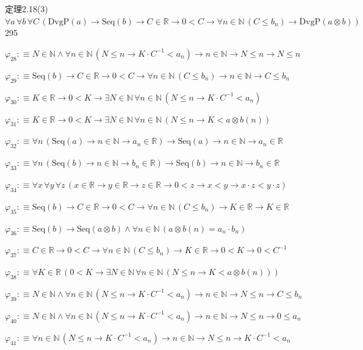\begin{fullproof}{定理2.18(3)}{$\forall a\,\forall b\,\forall C\,(\mathrm{DvgP}(a) \to \mathrm{Seq}(b) \to C \in \mathbb{R} \to 0 < C \to \forall n \in \mathbb{N}\,(C \leq b_{n}) \to \mathrm{DvgP}(a \otimes b))$}{295}
\begin{abbrevlist}
\item $\varphi_{28} :\equiv N \in \mathbb{N} \land \forall n \in \mathbb{N}\,(N \leq n \to K \cdot C^{-1} < a_{n}) \to n \in \mathbb{N} \to N \leq n \to N \leq n$
\item $\varphi_{29} :\equiv \mathrm{Seq}(b) \to C \in \mathbb{R} \to 0 < C \to \forall n \in \mathbb{N}\,(C \leq b_{n}) \to n \in \mathbb{N} \to C \leq b_{n}$
\item $\varphi_{30} :\equiv K \in \mathbb{R} \to 0 < K \to \exists N \in \mathbb{N}\,\forall n \in \mathbb{N}\,(N \leq n \to K \cdot C^{-1} < a_{n})$
\item $\varphi_{31} :\equiv K \in \mathbb{R} \to 0 < K \to \exists N \in \mathbb{N}\,\forall n \in \mathbb{N}\,(N \leq n \to K < a \otimes b(n))$
\item $\varphi_{32} :\equiv \forall n\,(\mathrm{Seq}(a) \to n \in \mathbb{N} \to a_{n} \in \mathbb{R}) \to \mathrm{Seq}(a) \to n \in \mathbb{N} \to a_{n} \in \mathbb{R}$
\item $\varphi_{33} :\equiv \forall n\,(\mathrm{Seq}(b) \to n \in \mathbb{N} \to b_{n} \in \mathbb{R}) \to \mathrm{Seq}(b) \to n \in \mathbb{N} \to b_{n} \in \mathbb{R}$
\item $\varphi_{34} :\equiv \forall x\,\forall y\,\forall z\,(x \in \mathbb{R} \to y \in \mathbb{R} \to z \in \mathbb{R} \to 0 < z \to x < y \to x \cdot z < y \cdot z)$
\item $\varphi_{35} :\equiv \mathrm{Seq}(b) \to C \in \mathbb{R} \to 0 < C \to \forall n \in \mathbb{N}\,(C \leq b_{n}) \to K \in \mathbb{R} \to K \in \mathbb{R}$
\item $\varphi_{36} :\equiv \mathrm{Seq}(b) \to \mathrm{Seq}(a \otimes b) \land \forall n \in \mathbb{N}\,(a \otimes b(n) = a_{n} \cdot b_{n})$
\item $\varphi_{37} :\equiv C \in \mathbb{R} \to 0 < C \to \forall n \in \mathbb{N}\,(C \leq b_{n}) \to K \in \mathbb{R} \to 0 < K \to 0 < C^{-1}$
\item $\varphi_{38} :\equiv \forall K \in \mathbb{R}\,(0 < K \to \exists N \in \mathbb{N}\,\forall n \in \mathbb{N}\,(N \leq n \to K < a \otimes b(n)))$
\item $\varphi_{39} :\equiv N \in \mathbb{N} \land \forall n \in \mathbb{N}\,(N \leq n \to K \cdot C^{-1} < a_{n}) \to n \in \mathbb{N} \to N \leq n \to C \leq b_{n}$
\item $\varphi_{40} :\equiv N \in \mathbb{N} \land \forall n \in \mathbb{N}\,(N \leq n \to K \cdot C^{-1} < a_{n}) \to n \in \mathbb{N} \to N \leq n \to 0 \leq a_{n}$
\item $\varphi_{41} :\equiv \forall n \in \mathbb{N}\,(N \leq n \to K \cdot C^{-1} < a_{n}) \to n \in \mathbb{N} \to N \leq n \to K \cdot C^{-1} < a_{n}$

\end{abbrevlist}
\end{fullproof}
